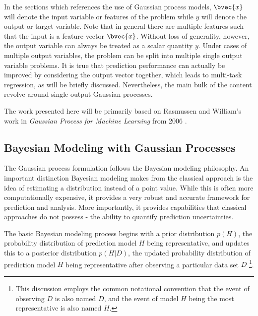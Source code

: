 		In the sections which references the use of Gaussian process models, $\bvec{x}$ will denote the input variable or features of the problem while $y$ will denote the output or target variable. Note that in general there are multiple features such that the input is a feature vector $\bvec{x}$. Without loss of generality, however, the output variable can always be treated as a scalar quantity $y$. Under cases of multiple output variables, the problem can be split into multiple single output variable problems. It is true that prediction performance can actually be improved by considering the output vector together, which leads to multi-task regression, as will be briefly discussed. Nevertheless, the main bulk of the content revolve around single output Gaussian processes.
		
		The work presented here will be primarily based on Rasmussen and William's work in \textit{Gaussian Process for Machine Learning} from 2006 \citep{GaussianProcessForMachineLearning}. 

		\subsection{Bayesian Modeling with Gaussian Processes}
		\label{Background:GaussianProcesses:BayesianModeling}
		
			The Gaussian process formulation follows the Bayesian modeling philosophy. An important distinction Bayesian modeling makes from the classical approach is the idea of estimating a distribution instead of a point value. While this is often more computationally expensive, it provides a very robust and accurate framework for prediction and analysis. More importantly, it provides capabilities that classical approaches do not possess - the ability to quantify prediction uncertainties. 
			
			The basic Bayesian modeling process begins with a prior distribution $p(H)$, the probability distribution of prediction model $H$ being representative, and updates this to a posterior distribution $p(H | D)$, the updated probability distribution of prediction model $H$ being representative after observing a particular data set $D$ \footnote{This discussion employs the common notational convention that the event of observing $D$ is also named $D$, and the event of model $H$ being the most representative is also named $H$.}. 
			
